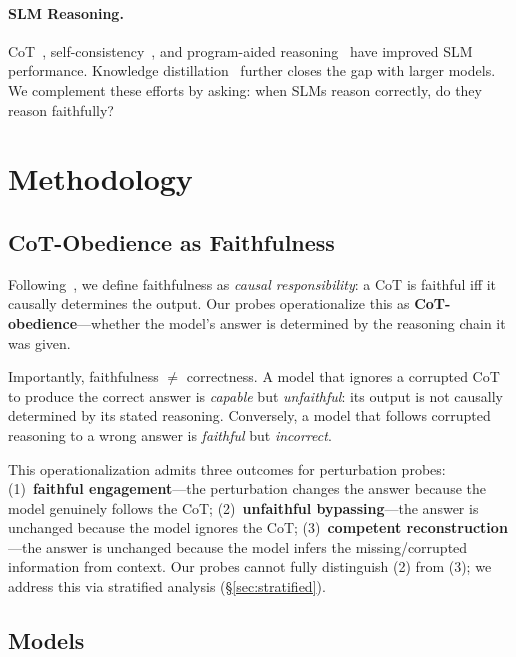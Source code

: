 \documentclass[11pt]{article}
\begin{document}
\paragraph{SLM Reasoning.} CoT~\cite{wei2022chain}, self-consistency~\cite{wang2023selfconsistency}, and program-aided reasoning~\cite{chen2023program,gao2023pal} have improved SLM performance. Knowledge distillation~\cite{wang2024survey} further closes the gap with larger models. We complement these efforts by asking: when SLMs reason correctly, do they reason faithfully?

\section{Methodology}
\label{sec:method}

\subsection{CoT-Obedience as Faithfulness}

Following~\cite{jacovi2020towards}, we define faithfulness as \emph{causal responsibility}: a CoT is faithful iff it causally determines the output. Our probes operationalize this as \textbf{CoT-obedience}---whether the model's answer is determined by the reasoning chain it was given.

Importantly, faithfulness $\neq$ correctness. A model that ignores a corrupted CoT to produce the correct answer is \emph{capable} but \emph{unfaithful}: its output is not causally determined by its stated reasoning. Conversely, a model that follows corrupted reasoning to a wrong answer is \emph{faithful} but \emph{incorrect}.

This operationalization admits three outcomes for perturbation probes: (1)~\textbf{faithful engagement}---the perturbation changes the answer because the model genuinely follows the CoT; (2)~\textbf{unfaithful bypassing}---the answer is unchanged because the model ignores the CoT; (3)~\textbf{competent reconstruction}---the answer is unchanged because the model infers the missing/corrupted information from context. Our probes cannot fully distinguish (2) from (3); we address this via stratified analysis (\S\ref{sec:stratified}).

\subsection{Models}
\end{document}
